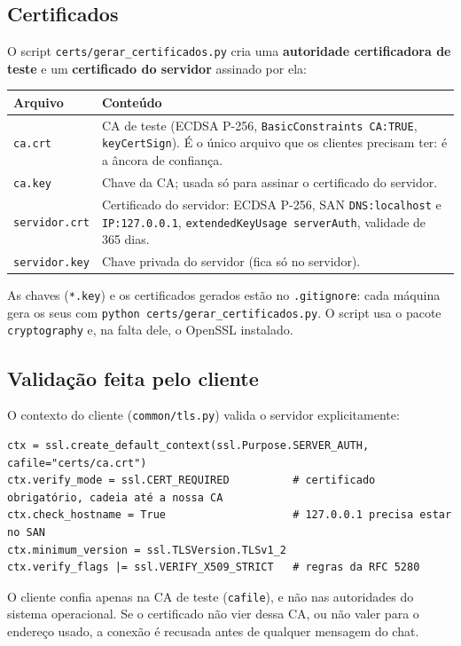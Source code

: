 \documentclass[11pt,a4paper]{article}
\newcommand{\cod}[1]{\texttt{#1}}
\begin{document}
\subsection{Certificados}
O script \cod{certs/gerar\_certificados.py} cria uma \textbf{autoridade certificadora de teste} e um
\textbf{certificado do servidor} assinado por ela:
\begin{center}
\small
\begin{tabularx}{\linewidth}{l X}
\toprule
\textbf{Arquivo} & \textbf{Conteúdo} \\
\midrule
\cod{ca.crt}       & CA de teste (ECDSA P-256, \cod{BasicConstraints CA:TRUE}, \cod{keyCertSign}). É o único
                     arquivo que os clientes precisam ter: é a âncora de confiança. \\
\cod{ca.key}       & Chave da CA; usada só para assinar o certificado do servidor. \\
\cod{servidor.crt} & Certificado do servidor: ECDSA P-256, SAN \cod{DNS:localhost} e \cod{IP:127.0.0.1},
                     \cod{extendedKeyUsage serverAuth}, validade de 365 dias. \\
\cod{servidor.key} & Chave privada do servidor (fica só no servidor). \\
\bottomrule
\end{tabularx}
\end{center}
As chaves (\cod{*.key}) e os certificados gerados estão no \cod{.gitignore}: cada máquina gera os seus
com \cod{python certs/gerar\_certificados.py}. O script usa o pacote \cod{cryptography} e, na falta
dele, o OpenSSL instalado.

\subsection{Validação feita pelo cliente}
O contexto do cliente (\cod{common/tls.py}) valida o servidor explicitamente:
\begin{lstlisting}[style=py]
ctx = ssl.create_default_context(ssl.Purpose.SERVER_AUTH, cafile="certs/ca.crt")
ctx.verify_mode = ssl.CERT_REQUIRED          # certificado obrigatório, cadeia até a nossa CA
ctx.check_hostname = True                    # 127.0.0.1 precisa estar no SAN
ctx.minimum_version = ssl.TLSVersion.TLSv1_2
ctx.verify_flags |= ssl.VERIFY_X509_STRICT   # regras da RFC 5280
\end{lstlisting}
O cliente confia apenas na CA de teste (\cod{cafile}), e não nas autoridades do sistema operacional.
Se o certificado não vier dessa CA, ou não valer para o endereço usado, a conexão é recusada antes
de qualquer mensagem do chat.
\end{document}
